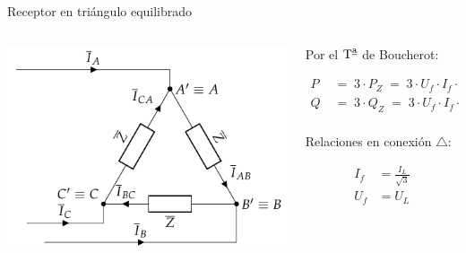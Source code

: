 \documentclass[aspectratio=169, usenames,svgnames,dvipsnames]{beamer}
\begin{document}
\begin{frame}{Receptor en triángulo equilibrado}
    \begin{columns}
    \begin{column}{0.4\columnwidth}
        \hspace*{-11mm}
        \includegraphics[width=1.2\linewidth]{../figs/TrianguloEquilibrado_Receptor.pdf}
    \end{column}
    
    \begin{column}{0.6\columnwidth}
        
        \vspace{3mm}
        Por el $\mbox{T}^{\textrm{\underline{a}}}$ de \alert{Boucherot}:

        \vspace{-6.5mm}
        \begin{align*}
            P &\;=\; 3 \cdot P_Z \;=\; 3 \cdot U_f\cdot I_f\cdot\cos(\theta)\\
            Q &\;=\; 3 \cdot Q_Z \;=\; 3 \cdot U_f\cdot I_f \cdot \sin(\theta)\\
        \end{align*}  

        \vspace{-6.5mm}
        Relaciones en conexión $\triangle$:

        \vspace{-7mm}
        \begin{align*}
          I_f &= \frac{I_L}{\sqrt{3}}\\
          U_f &= {U_L}
        \end{align*}


\end{column}
\end{columns}
\end{frame}
\end{document}
